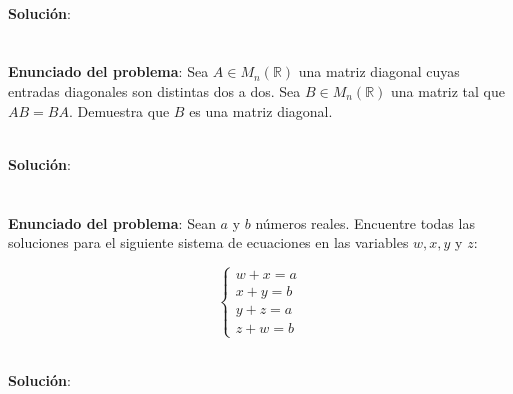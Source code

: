 \documentclass{article} %
\begin{document}
\\
\vspace{10 mm}
\textbf{Solución}:

				


\section{}

\textbf{Enunciado del problema}: Sea $A \in M_{n}(\mathbb{R})$ una matriz diagonal cuyas entradas diagonales son distintas dos a dos. Sea $B \in M_{n}(\mathbb{R})$ una matriz tal que $A B=B A$. Demuestra que $B$ es una matriz diagonal.

\\
\vspace{10 mm}
\textbf{Solución}:


				

\section{}

\textbf{Enunciado del problema}: Sean $a$ y $b$ números reales. Encuentre todas las soluciones para el siguiente sistema de ecuaciones en las variables $w,x,y$ y $z$:

$$\left\{\begin{array}{l}
w+x=a \\
x+y=b \\
y+z=a \\
z+w=b
\end{array}\right.$$

\\
\vspace{10 mm}
\textbf{Solución}:


				

\end{document}
